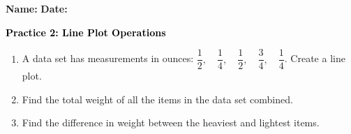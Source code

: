 \documentclass[12pt, letterpaper, fleqn]{article}
\begin{document}
\textbf{Name:} \underline{\hspace{5cm}}
\hfill
\textbf{Date:} \underline{\hspace{3cm}}\\

\begin{tcolorbox}[colback=customteal!20]
    \large\textcolor{black}{\textbf{Practice 2: Line Plot Operations}}
\end{tcolorbox}
\begin{enumerate}[itemsep=3.5cm, leftmargin=0.6cm]
\item A data set has measurements in ounces: $\dfrac{1}{2}, \quad \dfrac{1}{4}, \quad \dfrac{1}{2}, \quad \dfrac{3}{4}, \quad \dfrac{1}{4}$. Create a line plot.
\vspace{4cm}
\item Find the total weight of all the items in the data set combined.
\vspace{3cm}
\item Find the difference in weight between the heaviest and lightest items.
\end{enumerate}
\end{document}
